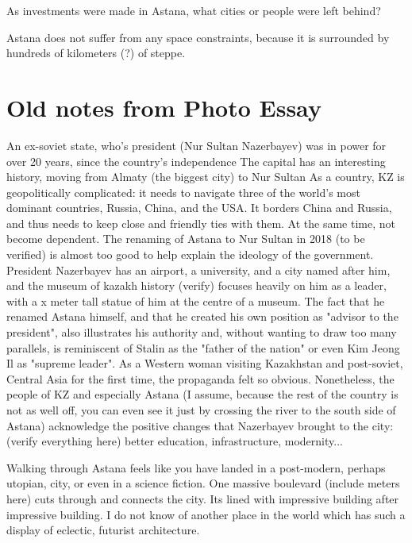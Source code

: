 \documentclass{article}
\begin{document}
As investments were made in Astana, what cities or people were left behind?

Astana does not suffer from any space constraints, because it is surrounded by hundreds of kilometers (?) of steppe. 



\section{Old notes from Photo Essay}

An ex-soviet state, who's president (Nur Sultan Nazerbayev) was in power for over 20 years, since the country's independence
The capital has an interesting history, moving from Almaty (the biggest city) to Nur Sultan
As a country, KZ is geopolitically complicated: it needs to navigate three of the world's most dominant countries, Russia, China, and the USA. It borders China and Russia, and thus needs to keep close and friendly ties with them. At the same time, not become dependent.
The renaming of Astana to Nur Sultan in 2018 (to be verified) is almost too good to help explain the ideology of the government. President Nazerbayev has an airport, a university, and a city named after him, and the museum of kazakh history (verify) focuses heavily on him as a leader, with a x meter tall statue of him at the centre of a museum.
 The fact that he renamed Astana himself, and that he created his own position as "advisor to the president", also illustrates his authority and, without wanting to draw too many parallels, is reminiscent of Stalin as the "father of the nation" or even Kim Jeong Il as "supreme leader". 
 As a Western woman visiting Kazakhstan and post-soviet, Central Asia for the first time, the propaganda felt so obvious.
 Nonetheless, the people of KZ and especially Astana (I assume, because the rest of the country is not as well off, you can even see it just by crossing the river to the south side of Astana) acknowledge the positive changes that Nazerbayev brought to the city: (verify everything here) better education, infrastructure, modernity...
 
Walking through Astana feels like you have landed in a post-modern, perhaps utopian, city, or even in a science fiction. One massive boulevard (include meters here) cuts through and connects the city. Its lined with impressive building after impressive building. I do not know of another place in the world which has such a display of eclectic, futurist architecture.
\end{document}

